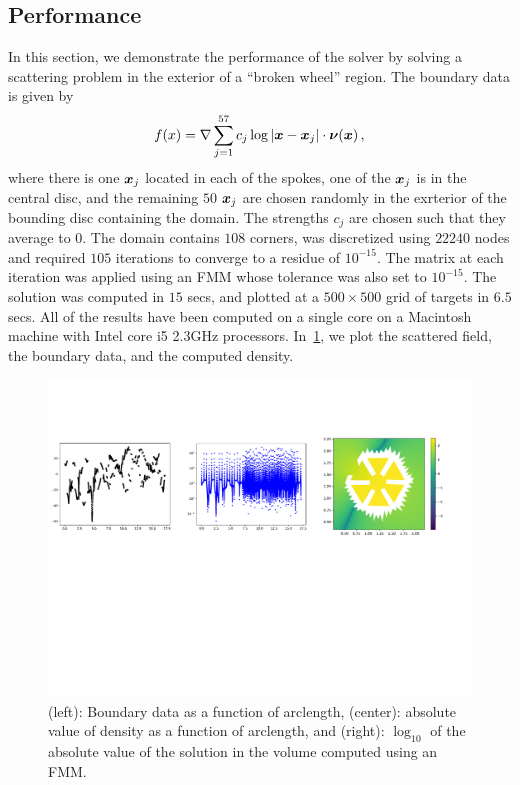 \subsection{Performance}
In this section, we demonstrate the performance of the solver by solving a scattering problem in the
exterior of a ``broken wheel'' region. The boundary data is given by
\begin{equation}
f(x) = \nabla  \sum_{j=1}^{57} c_{j} \log| \boldsymbol{x} - \boldsymbol{x}_{j}| \cdot \boldsymbol{\nu}(\boldsymbol{x}) \, , 
\end{equation}
where there is one $\boldsymbol{x}_{j}$ located in each of the spokes, one of the $\boldsymbol{x}_{j}$ is in the central disc, and the remaining $50$ $\boldsymbol{x}_{j}$ are chosen randomly in the exrterior of the bounding disc containing the domain. The strengths $c_{j}$ are chosen such that they average to $0$. The domain contains $108$ corners, was discretized using $22240$ nodes and required $105$ iterations to converge to a residue of $10^{-15}$. The matrix at each iteration was applied using an FMM whose tolerance was also set to $10^{-15}$. The solution was computed in $15$ secs, and plotted at a $500\times 500$ grid of targets in $6.5$ secs. All of the results have been computed on a single core on a Macintosh machine with Intel core i5 2.3GHz processors. In~\cref{fig:magnetron}, we plot the scattered field, the boundary data, and the computed density.

\begin{figure}
\begin{center}
\includegraphics[width=\linewidth]{media/magnetron}
\caption{(left): Boundary data as a function of arclength, (center): absolute value of density as a function of arclength, and 
(right): $\log_{10}$ of the absolute value of the solution in the volume computed using an FMM.}
\label{fig:magnetron}
\end{center}
\end{figure}